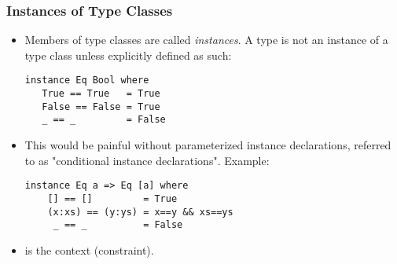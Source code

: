 \documentclass{beamer}
\newcommand{\ttcode}[1]{{\color{red}{\tt{#1}}}}
\begin{document}
\begin{frame}[fragile]
    \frametitle{Instances of Type Classes}
\begin{itemize}
\item Members of type classes are called \emph{instances}. 
A type is not an instance of a type class unless explicitly defined as such:
{\color{red}
\begin{verbatim} 
instance Eq Bool where 
   True == True   = True 
   False == False = True 
   _ == _         = False 
\end{verbatim}
}

\item
This would be painful without parameterized instance declarations, 
referred to as "conditional instance declarations". Example: 
{\color{red}
\begin{verbatim}
instance Eq a => Eq [a] where 
    [] == []         = True 
    (x:xs) == (y:ys) = x==y && xs==ys 
     _ == _          = False 
\end{verbatim}
}

\item
\ttcode{Eq a =>} is the context (constraint). 

\end{itemize}

\end{frame}
\end{document}
